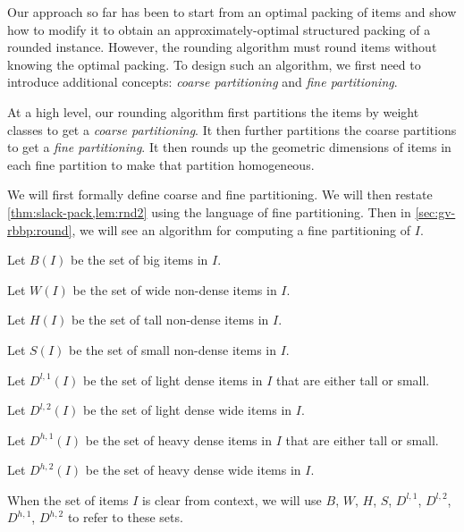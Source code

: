 Our approach so far has been to start from an optimal packing of items and show how to
modify it to obtain an approximately-optimal structured packing of a rounded instance.
However, the rounding algorithm must round items without knowing the optimal packing.
To design such an algorithm, we first need to introduce additional concepts:
\emph{coarse partitioning} and \emph{fine partitioning}.

At a high level, our rounding algorithm first partitions the items by weight classes
to get a \emph{coarse partitioning}. It then further partitions the coarse partitions
to get a \emph{fine partitioning}. It then rounds up the geometric dimensions of items
in each fine partition to make that partition homogeneous.

We will first formally define coarse and fine partitioning.
We will then restate \cref{thm:slack-pack,lem:rnd2} using the language of fine partitioning.
Then in \cref{sec:gv-rbbp:round}, we will see an algorithm for computing a fine partitioning of $I$.

\begin{tightemize}
\item Let $B(I)$ be the set of big items in $I$.
\item Let $W(I)$ be the set of wide non-dense items in $I$.
\item Let $H(I)$ be the set of tall non-dense items in $I$.
\item Let $S(I)$ be the set of small non-dense items in $I$.
\item Let $D^{l,1}(I)$ be the set of light dense items in $I$ that are either tall or small.
\item Let $D^{l,2}(I)$ be the set of light dense wide items in $I$.
\item Let $D^{h,1}(I)$ be the set of heavy dense items in $I$ that are either tall or small.
\item Let $D^{h,2}(I)$ be the set of heavy dense wide items in $I$.
\end{tightemize}
When the set of items $I$ is clear from context, we will use
$B$, $W$, $H$, $S$, $D^{l,1}$, $D^{l,2}$, $D^{h,1}$, $D^{h,2}$ to refer to these sets.

